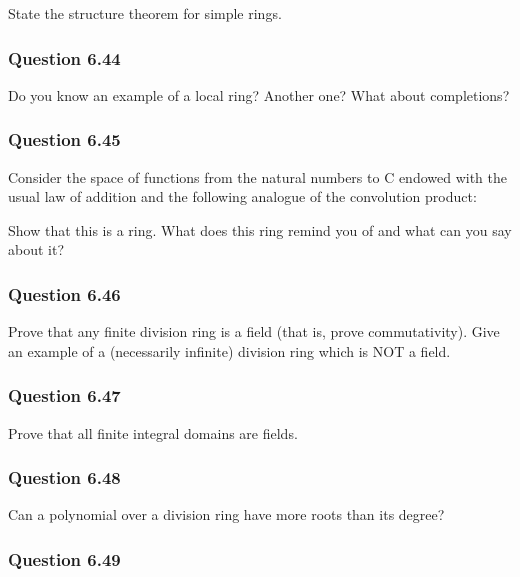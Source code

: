 State the structure theorem for simple rings.

\hypertarget{question-6.44}{%
\subsubsection{Question 6.44}\label{question-6.44}}

Do you know an example of a local ring? Another one? What about
completions?

\hypertarget{question-6.45}{%
\subsubsection{Question 6.45}\label{question-6.45}}

Consider the space of functions from the natural numbers to C endowed
with the usual law of addition and the following analogue of the
convolution product:


Show that this is a ring. What does this ring remind you of and what can
you say about it?

\hypertarget{question-6.46}{%
\subsubsection{Question 6.46}\label{question-6.46}}

Prove that any finite division ring is a field (that is, prove
commutativity). Give an example of a (necessarily infinite) division
ring which is NOT a field.

\hypertarget{question-6.47}{%
\subsubsection{Question 6.47}\label{question-6.47}}

Prove that all finite integral domains are fields.

\hypertarget{question-6.48}{%
\subsubsection{Question 6.48}\label{question-6.48}}

Can a polynomial over a division ring have more roots than its degree?

\hypertarget{question-6.49}{%
\subsubsection{Question 6.49}\label{question-6.49}}

